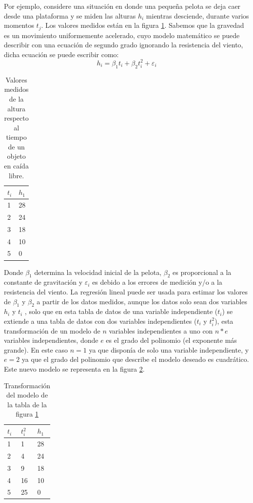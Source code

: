 Por ejemplo, considere una situación en donde una pequeña pelota se deja caer desde una plataforma y se miden las alturas $h_i$ mientras desciende, durante varios momentos $t_j$. 
Los valores medidos están en la figura \ref{tab:valoresMedidos}. 
Sabemos que la gravedad es un movimiento uniformemente acelerado, cuyo modelo matemático se puede describir con una ecuación de segundo grado ignorando la resistencia del viento, dicha ecuación se puede escribir como: 
$$h_i = \beta_1 t_i + \beta_2 t_i^{2} + \varepsilon_i$$
\begin{table}[!h]
	\begin{center}
		\begin{tabular}{|p{2.5cm}|p{2.5cm}|}\hline
			$t_i$ & $h_1$ \\ \hline
				1 & 28  	\\ \hline
				2 & 24	\\\hline
				3 & 18  \\\hline
				4 & 10  \\\hline
				5 & 0  \\\hline
		\end{tabular}			
	\end{center}
	\caption{Valores medidos de la altura respecto al tiempo de un objeto en caída libre.}
	\label{tab:valoresMedidos}
\end{table}


Donde $\beta_1$ determina la velocidad inicial de la pelota, $\beta_2$ es proporcional a la constante de gravitación y $\varepsilon_i$ es debido a los errores de medición y/o a la resistencia del viento.
La regresión lineal puede ser usada para estimar los valores de $\beta_1$ y $\beta_2$  a partir de los datos medidos, aunque los datos solo sean dos variables $h_i$ y $t_i$ , solo que en esta tabla de datos de una variable independiente ($t_i$) se extiende a una tabla de datos con dos variables independientes ($t_i$ y $t_i^{2}$), esta transformación de un modelo de $n$ variables independientes a uno con $n*e$ variables independientes, donde $e$ es el grado del polinomio (el exponente más grande). En este caso $n=1$ ya que disponía de solo una variable independiente, y $e=2$ ya que el grado del polinomio que describe el modelo deseado es cuadrático. Este nuevo modelo se representa en la figura \ref{tab:transformacionModelo}.
\begin{table}[!h]  
	\begin{center}
		\begin{tabular}{|p{2.5cm}|p{2.5cm}|p{2.5cm}|}\hline
				$t_i$ & $t_i^{2}$ & $h_1$  \\ \hline
				1 & 1 & 28 	\\ \hline
				2 & 4 & 24	\\\hline
				3 & 9 & 18\\\hline
				4 & 16& 10  \\\hline
				5 & 25& 0   \\\hline
		\end{tabular}			
	\end{center}
	\caption{ Transformación del modelo de la tabla de la figura \ref{tab:valoresMedidos}}
	\label{tab:transformacionModelo}
\end{table}

